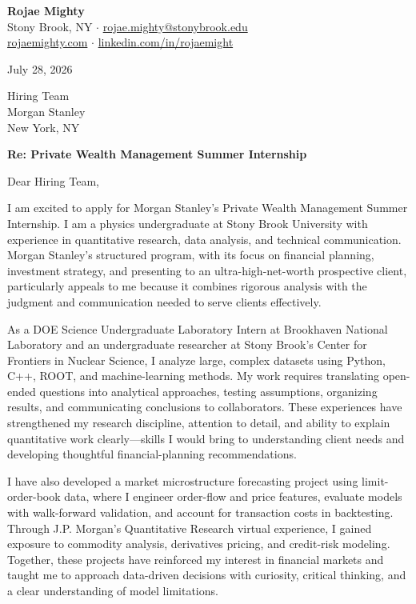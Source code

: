 \documentclass[10pt,letterpaper]{article}
\begin{document}
\textbf{Rojae Mighty}\\
Stony Brook, NY \quad$\cdot$\quad
\href{mailto:rojae.mighty@stonybrook.edu}{rojae.mighty@stonybrook.edu}\\
\href{https://rojaemighty.com}{rojaemighty.com} \quad$\cdot$\quad
\href{https://www.linkedin.com/in/rojaemight/}{linkedin.com/in/rojaemight}

\vspace{8pt}
July 28, 2026

\vspace{8pt}
Hiring Team\\
Morgan Stanley\\
New York, NY

\vspace{8pt}
\textbf{Re: Private Wealth Management Summer Internship}

\vspace{4pt}
Dear Hiring Team,

I am excited to apply for Morgan Stanley's Private Wealth Management Summer Internship. I am a physics undergraduate at Stony Brook University with experience in quantitative research, data analysis, and technical communication. Morgan Stanley's structured program, with its focus on financial planning, investment strategy, and presenting to an ultra-high-net-worth prospective client, particularly appeals to me because it combines rigorous analysis with the judgment and communication needed to serve clients effectively.

As a DOE Science Undergraduate Laboratory Intern at Brookhaven National Laboratory and an undergraduate researcher at Stony Brook's Center for Frontiers in Nuclear Science, I analyze large, complex datasets using Python, C++, ROOT, and machine-learning methods. My work requires translating open-ended questions into analytical approaches, testing assumptions, organizing results, and communicating conclusions to collaborators. These experiences have strengthened my research discipline, attention to detail, and ability to explain quantitative work clearly---skills I would bring to understanding client needs and developing thoughtful financial-planning recommendations.

I have also developed a market microstructure forecasting project using limit-order-book data, where I engineer order-flow and price features, evaluate models with walk-forward validation, and account for transaction costs in backtesting. Through J.P. Morgan's Quantitative Research virtual experience, I gained exposure to commodity analysis, derivatives pricing, and credit-risk modeling. Together, these projects have reinforced my interest in financial markets and taught me to approach data-driven decisions with curiosity, critical thinking, and a clear understanding of model limitations.
\end{document}
